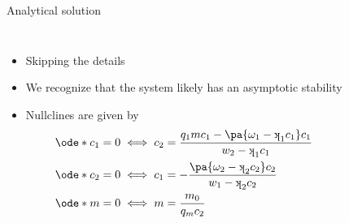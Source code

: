 \documentclass[aspectratio=169,  notheorems, sOuRcEs]{RUCPresentation}
\def\k{\raisebox{1ex}{\rotatebox{180}{k}}}
\begin{document}
\begin{frame}{Analytical solution}


    \begin{columns}[T]
        \column{0.5\framewidth}
        \begin{itemize}
            \item Skipping the details
            \item We recognize that the system likely has an asymptotic stability
            \item Nullclines are given by
                \begin{align*}
                    \ode* c_1 = 0 &\iff c_2 = {q_1 m c_1- \pa{\omega_1 - \k_1c_1}c_1 \over w_2 - \k_1 c_1}
                    \\
                    \ode* c_2 = 0 &\iff c_1 = -{\pa{\omega_{2} - \k_{2} c_2} c_2 \over w_1 - \k_{2}c_2}
                    \\
                    \ode* m = 0 &\iff m = {m_0 \over q_m c_2}
                \end{align*}
        \end{itemize}


        \column{0.5\framewidth}

    \end{columns}


\end{frame}
\end{document}

